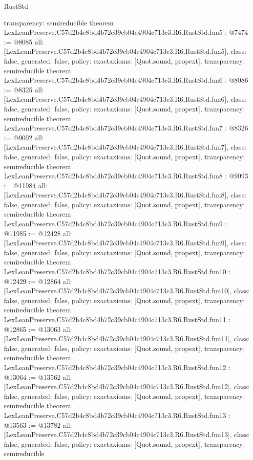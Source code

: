\begin{lexlean}{RustStd}
\begin{coremodule}
{  transparency: semireducible
}
theorem LexLeanPreserve.C57d2b4c8bd4b72c39cb04c4904c713c3.R6.RustStd.fun5 : @7474 := @8085 {
  all: [LexLeanPreserve.C57d2b4c8bd4b72c39cb04c4904c713c3.R6.RustStd.fun5],
  class: false,
  generated: false,
  policy: exact{axioms: [Quot.sound, propext]},
  transparency: semireducible
}
theorem LexLeanPreserve.C57d2b4c8bd4b72c39cb04c4904c713c3.R6.RustStd.fun6 : @8086 := @8325 {
  all: [LexLeanPreserve.C57d2b4c8bd4b72c39cb04c4904c713c3.R6.RustStd.fun6],
  class: false,
  generated: false,
  policy: exact{axioms: [Quot.sound, propext]},
  transparency: semireducible
}
theorem LexLeanPreserve.C57d2b4c8bd4b72c39cb04c4904c713c3.R6.RustStd.fun7 : @8326 := @9092 {
  all: [LexLeanPreserve.C57d2b4c8bd4b72c39cb04c4904c713c3.R6.RustStd.fun7],
  class: false,
  generated: false,
  policy: exact{axioms: [Quot.sound, propext]},
  transparency: semireducible
}
theorem LexLeanPreserve.C57d2b4c8bd4b72c39cb04c4904c713c3.R6.RustStd.fun8 : @9093 := @11984 {
  all: [LexLeanPreserve.C57d2b4c8bd4b72c39cb04c4904c713c3.R6.RustStd.fun8],
  class: false,
  generated: false,
  policy: exact{axioms: [Quot.sound, propext]},
  transparency: semireducible
}
theorem LexLeanPreserve.C57d2b4c8bd4b72c39cb04c4904c713c3.R6.RustStd.fun9 : @11985 := @12428 {
  all: [LexLeanPreserve.C57d2b4c8bd4b72c39cb04c4904c713c3.R6.RustStd.fun9],
  class: false,
  generated: false,
  policy: exact{axioms: [Quot.sound, propext]},
  transparency: semireducible
}
theorem LexLeanPreserve.C57d2b4c8bd4b72c39cb04c4904c713c3.R6.RustStd.fun10 : @12429 := @12864 {
  all: [LexLeanPreserve.C57d2b4c8bd4b72c39cb04c4904c713c3.R6.RustStd.fun10],
  class: false,
  generated: false,
  policy: exact{axioms: [Quot.sound, propext]},
  transparency: semireducible
}
theorem LexLeanPreserve.C57d2b4c8bd4b72c39cb04c4904c713c3.R6.RustStd.fun11 : @12865 := @13063 {
  all: [LexLeanPreserve.C57d2b4c8bd4b72c39cb04c4904c713c3.R6.RustStd.fun11],
  class: false,
  generated: false,
  policy: exact{axioms: [Quot.sound, propext]},
  transparency: semireducible
}
theorem LexLeanPreserve.C57d2b4c8bd4b72c39cb04c4904c713c3.R6.RustStd.fun12 : @13064 := @13562 {
  all: [LexLeanPreserve.C57d2b4c8bd4b72c39cb04c4904c713c3.R6.RustStd.fun12],
  class: false,
  generated: false,
  policy: exact{axioms: [Quot.sound, propext]},
  transparency: semireducible
}
theorem LexLeanPreserve.C57d2b4c8bd4b72c39cb04c4904c713c3.R6.RustStd.fun13 : @13563 := @13782 {
  all: [LexLeanPreserve.C57d2b4c8bd4b72c39cb04c4904c713c3.R6.RustStd.fun13],
  class: false,
  generated: false,
  policy: exact{axioms: [Quot.sound, propext]},
  transparency: semireducible
}
\end{coremodule}
\end{lexlean}
